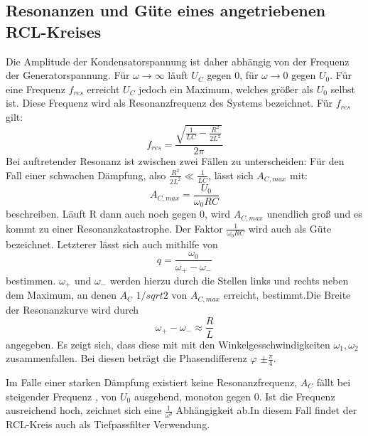 \subsection{Resonanzen und Güte eines angetriebenen RCL-Kreises}
Die Amplitude der Kondensatorspannung ist daher abhängig von der Frequenz der Generatorspannung.
Für $\omega \to \infty$ läuft $U_C$ gegen 0, für $\omega \to 0$ gegen $U_0$.
Für eine Frequenz $f_{res}$ erreicht $U_C$  jedoch ein Maximum, welches größer als $U_0$ selbst ist.
Diese Frequenz wird als Resonanzfrequenz des Systems bezeichnet. Für $f_{res}$ gilt:
\begin{equation}
  f_{res} = \frac{\sqrt{\frac{1}{LC}-\frac{R^2}{2L^2}}}{2 \pi}
\end{equation}
Bei auftretender Resonanz ist zwischen zwei Fällen zu unterscheiden:
Für den Fall einer schwachen Dämpfung, also $\frac{R^2}{2L^2} \ll \frac{1}{LC}$, lässt sich $A_{C,max}$ mit:
\begin{equation}
  A_{C,max} = \frac{U_0}{\omega_0 RC}
\end{equation}
beschreiben.
Läuft R dann auch noch gegen 0, wird $A_{C,max}$ unendlich groß und es kommt zu einer
Resonanzkatastrophe.
 Der Faktor $\frac{1}{\omega_0 RC}$ wird auch als Güte bezeichnet.
Letzterer lässt sich auch mithilfe von
\begin{equation}
  q = \frac{\omega_0}{\omega_+ - \omega_-}
  \end{equation}
bestimmen. $\omega_+$ und $\omega_-$ werden  hierzu durch die Stellen links und rechts neben dem Maximum,
 an denen $A_C$ $1/sqrt{2}$ von $A_{C,max}$ erreicht, bestimmt.Die Breite der Resonanzkurve wird durch
 \begin{equation}
   \omega_+ - \omega_- \approx \frac{R}{L}
 \end{equation}
 angegeben. Es zeigt sich, dass diese mit mit den Winkelgesschwindigkeiten $\omega_1,\omega_2$ zusammenfallen.
  Bei diesen beträgt die Phasendifferenz $\varphi$ $\pm \frac{\pi}{4}$.


 Im Falle einer starken Dämpfung existiert keine Resonanzfrequenz, $A_C$ fällt bei steigender Frequenz
 , von $U_0$ ausgehend, monoton gegen 0. Ist die Frequenz ausreichend hoch, zeichnet
  sich eine $\frac{1}{\omega²}$ Abhängigkeit ab.In diesem Fall findet der RCL-Kreis auch als Tiefpassfilter Verwendung.
